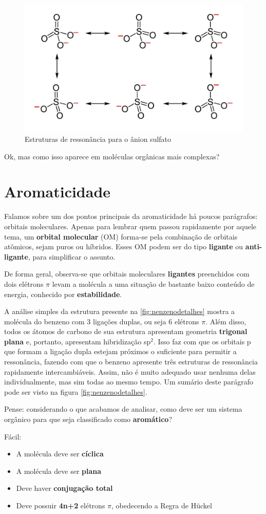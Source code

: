 \documentclass[a4paper,12pt]{book}
\begin{document}
\begin{figure}[h]
	\centering
	\caption{Estruturas de ressonância para o ânion sulfato}
	\label{fig:sulfato}
	\includegraphics[width=0.5\linewidth]{imagens/Sulfate-resonance.jpg}
\end{figure}

Ok, mas como isso aparece em moléculas orgânicas mais complexas?

\section{Aromaticidade}
Falamos sobre um dos pontos principais da aromaticidade há poucos parágrafos: orbitais moleculares. Apenas para lembrar quem passou rapidamente por aquele tema, um \textbf{orbital molecular} (OM) forma-se pela combinação de orbitais atômicos, sejam puros ou híbridos. Esses OM podem ser do tipo \textbf{ligante} ou \textbf{anti-ligante}, para simplificar o assunto.

De forma geral, observa-se que orbitais moleculares \textbf{ligantes} preenchidos com dois elétrons {$\pi$} levam a molécula a uma situação de bastante baixo conteúdo de energia, conhecido por \textbf{estabilidade}. 

A análise simples da estrutura presente na \ref{fig:nenzenodetalhes} mostra a molécula do benzeno com 3 ligações duplas, ou seja 6 elétrons {$\pi$}. Além disso, todos os átomos de carbono de sua estrutura apresentam geometria \textbf{trigonal plana} e, portanto, apresentam hibridização sp{$^2$}. Isso faz com que os orbitais p que formam a ligação dupla estejam próximos o suficiente para permitir a ressonância, fazendo com que o benzeno apresente três estruturas de ressonância rapidamente intercambiáveis. Assim, não é muito adequado usar nenhuma delas individualmente, mas sim todas ao mesmo tempo. Um sumário deste parágrafo pode ser visto na figura \ref{fig:nenzenodetalhes}.

Pense: considerando o que acabamos de analisar, como deve ser um sistema orgânico para que seja classificado como \textbf{aromático}?

Fácil:
\begin{itemize}
	\item A molécula deve ser \textbf{cíclica}
	\item A molécula deve ser \textbf{plana}
	\item Deve haver \textbf{conjugação total}
	\item Deve possuir \textbf{4n+2} elétrons {$\pi$}, obedecendo a Regra de Hückel
\end{itemize}
\end{document}
